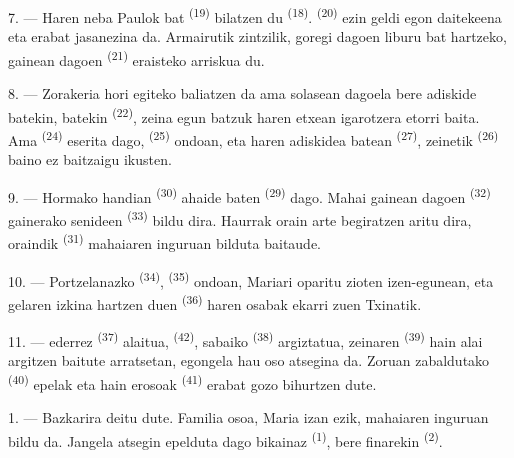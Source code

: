 \VUsaut{5.0mm}
\VUsaut{3.0mm}

7. --- Haren neba Paulok  bat \textsuperscript{(19)} bilatzen du
 \textsuperscript{(18)}. 
\textsuperscript{(20)} ezin geldi egon daitekeena eta erabat jasanezina da.
Armairutik zintzilik, goregi dagoen liburu bat hartzeko, gainean dagoen
 \textsuperscript{(21)} eraisteko arriskua du.

8. --- Zorakeria hori egiteko baliatzen da ama solasean dagoela bere adiskide
batekin,  batekin \textsuperscript{(22)}, zeina egun batzuk haren
etxean igarotzera etorri baita. Ama  \textsuperscript{(24)}
eserita dago,  \textsuperscript{(25)} ondoan, eta haren
adiskidea  batean \textsuperscript{(27)}, zeinetik
 \textsuperscript{(26)} baino ez baitzaigu ikusten.

9. --- Hormako  handian \textsuperscript{(30)} ahaide baten
 \textsuperscript{(29)} dago. Mahai gainean dagoen
 \textsuperscript{(32)} gainerako senideen 
\textsuperscript{(33)} bildu dira. Haurrak orain arte begiratzen aritu dira, oraindik
 \textsuperscript{(31)} mahaiaren inguruan bilduta baitaude.

10. --- Portzelanazko  \textsuperscript{(34)},
 \textsuperscript{(35)} ondoan, Mariari oparitu zioten
izen-egunean, eta gelaren izkina hartzen duen 
\textsuperscript{(36)} haren osabak ekarri zuen Txinatik.

11. ---  ederrez \textsuperscript{(37)} alaitua,
 \textsuperscript{(42)}, sabaiko 
\textsuperscript{(38)} argiztatua, zeinaren 
\textsuperscript{(39)} hain alai argitzen baitute arratsetan, egongela hau oso
atsegina da. Zoruan zabaldutako  \textsuperscript{(40)} epelak eta
hain  erosoak \textsuperscript{(41)} erabat gozo
bihurtzen dute.

\VUsaut{3.6mm}
\VUsaut{3.0mm}

1. --- Bazkarira deitu dute. Familia osoa, Maria izan ezik, mahaiaren inguruan
bildu da. Jangela atsegin epelduta dago  bikainaz
\textsuperscript{(1)}, bere  finarekin \textsuperscript{(2)}.

